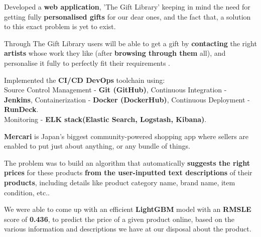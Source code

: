 \documentclass[]{essdee-resume}
\begin{document}
\begin{minipage}[t]{0.66\textwidth}
\begin{tightemize}
\item Developed a \textbf{web application}, 'The Gift Library' keeping in mind the need for getting fully \textbf{personalised gifts} for our dear ones, and the fact that, a solution to this exact problem is yet to exist.
\item Through The Gift Library users will be able to get a gift by \textbf{contacting} the right \textbf{artists} whose work they like (after \textbf{browsing through them} all), and personalise it fully to perfectly fit their requirements .
\item Implemented the \textbf{CI/CD DevOps} toolchain using: \\
Source Control Management - \textbf{Git (GitHub)}, 
Continuous Integration - \textbf{Jenkins}, 
Containerization - \textbf{Docker (DockerHub)},
Continuous Deployment - \textbf{RunDeck}.\\
Monitoring - \textbf{ELK stack(Elastic Search, Logstash, Kibana)}.
\end{tightemize}
\sectionsep

\begin{tightemize}
\item \textbf{Mercari} is Japan’s biggest community-powered shopping app where sellers are enabled to put just about anything, or any bundle of things.
\item The problem was to build an algorithm that automatically \textbf{suggests the right prices} for these products \textbf{from the user-inputted text descriptions} of their \textbf{products}, including details like product category name, brand name, item condition, etc..
\item We  were  able  to  come up  with  an  efficient \textbf{LightGBM} model  with an  \textbf{RMSLE} score of \textbf{0.436}, to predict the price of a given product online, based on the various information and descriptions we have at our disposal about the product.
\end{tightemize}
\sectionsep








\end{minipage}
\end{document}
